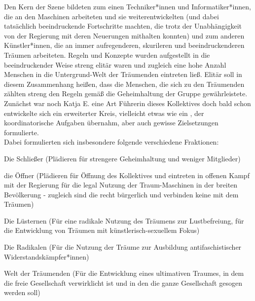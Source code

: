 \documentclass[12pt, a4paper, openany]{report}
\let\tempone\itemize
\let\temptwo\enditemize
\renewenvironment{itemize}{\tempone\addtolength{\itemsep}{-0.5\baselineskip}}{\temptwo}
\begin{document}
Den Kern der Szene bildeten zum einen Techniker*innen und Informatiker*innen, die an den Maschinen arbeiteten und sie weiterentwickelten (und dabei tatsächlich beeindruckende Fortschritte machten, die trotz der Unabhängigkeit von der Regierung mit deren Neuerungen mithalten konnten) und zum anderen Künstler*innen, die an immer aufregenderen, skurileren und beeindruckenderen Träumen arbeiteten. 
Regeln und Konzepte wurden aufgestellt in die beeindruckender Weise streng elitär waren und zugleich eine hohe Anzahl Menschen in die Untergrund-Welt der Träumenden eintreten ließ.
Elitär soll in diesem Zusammenhang heißen, dass die Menschen, die sich zu den Träumenden zählten streng den Regeln gemäß die Geheimhaltung der Gruppe gewährleistete. \\
Zunächst war noch Katja E. eine Art Führerin dieses Kollektives doch bald schon entwickelte sich ein erweiterter Kreis, vielleicht etwas wie ein , der koordinatorische Aufgaben übernahm, aber auch gewisse Zielsetzungen formulierte.\\
Dabei formulierten sich insbesondere folgende verschiedene Fraktionen:
\begin{itemize}
  \setlength\itemsep{0em}
  \item Die Schließer (Plädieren für strengere Geheimhaltung und weniger Mitglieder)
  \item die Öffner (Plädieren für Öffnung des Kollektives und eintreten in offenen Kampf mit der Regierung für die legal Nutzung der Traum-Maschinen in der breiten Bevölkerung - zugleich sind die recht bürgerlich und verbinden keine  mit dem Träumen)
  \item Die Lüsternen (Für eine radikale Nutzung des Träumens zur Lustbefreiung, für die Entwicklung von Träumen mit künstlerisch-sexuellem Fokus)
  \item Die Radikalen (Für die Nutzung der Träume zur Ausbildung antifaschistischer Widerstandskämpfer*innen)
  \item Welt der Träumenden (Für die Entwicklung eines ultimativen Traumes, in dem die freie Gesellschaft verwirklicht ist und in den die ganze Gesellschaft gesogen werden soll)
\end{itemize}
\end{document}
